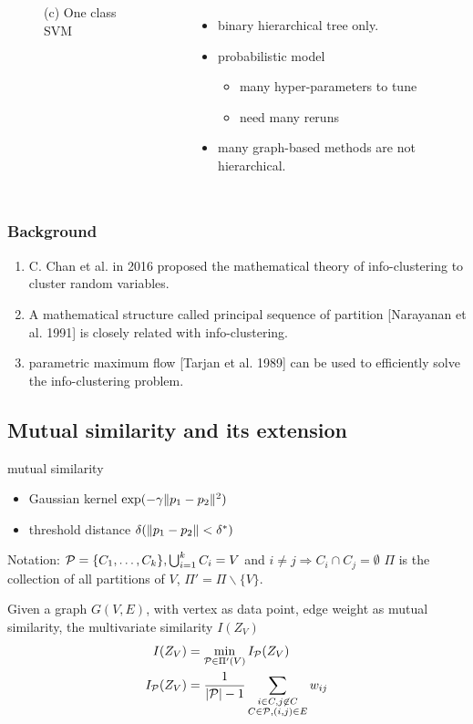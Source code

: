 \documentclass[notheorems]{beamer}
\begin{document}
\begin{frame}
\begin{columns}
\begin{figure}
		\caption*{ \textcolor{thupurple}{(c)} One class SVM}
\end{figure}
\begin{itemize}
\item binary hierarchical tree only.
\item probabilistic model
\begin{itemize}
\item many hyper-parameters to tune 
\item need many reruns
\end{itemize}
\item many graph-based methods are not hierarchical.
\end{itemize}
\end{columns}
\end{frame}
\begin{frame}
	\frametitle{Background}
	\begin{enumerate}
		\item C. Chan et al. in 2016 proposed the mathematical theory of info-clustering to cluster random variables.
		\item A mathematical structure called principal sequence of partition [Narayanan et al. 1991] is closely related with info-clustering.
		\item parametric maximum flow [Tarjan et al. 1989] can be used to efficiently solve the info-clustering problem.
	\end{enumerate}
\end{frame}
\subsection{Mutual similarity and its extension}
\begin{frame}
\begin{block}{mutual similarity}
\begin{itemize}
\item Gaussian kernel $ \exp({-\gamma \norm{p_1 - p_2}^2})$
\item threshold distance $\delta(\norm{p_1-p_2} < \delta^*)$
\end{itemize}
\end{block}
Notation:  $\P=\{C_1, \dots, C_k\}, \bigcup_{i=1}^k C_i = V$ and $i\neq j \Rightarrow C_i \cap C_j = \emptyset$
$\Pi$ is the collection of all partitions of $V$, $\Pi' = \Pi \backslash \{V\}$.
\begin{definition}
Given a graph $G(V, E)$, with vertex as data point, edge weight as mutual similarity, the multivariate similarity $I(Z_V)$
\begin{align}
I(Z_V) & = \min_{\mathcal{P} \in \Pi'(V)} I_{\mathcal{P}}(Z_V) \\
\label{eq:newDef}  I_{\mathcal{P}}(Z_V) & = \frac{1}{ \abs{\mathcal{P}} - 1} \sum_{\substack{i\in C, j \not\in C\\ C\in \mathcal{P}, (i,j) \in E}} w_{ij}
\end{align}
\end{definition}
\end{frame}
\end{document}
